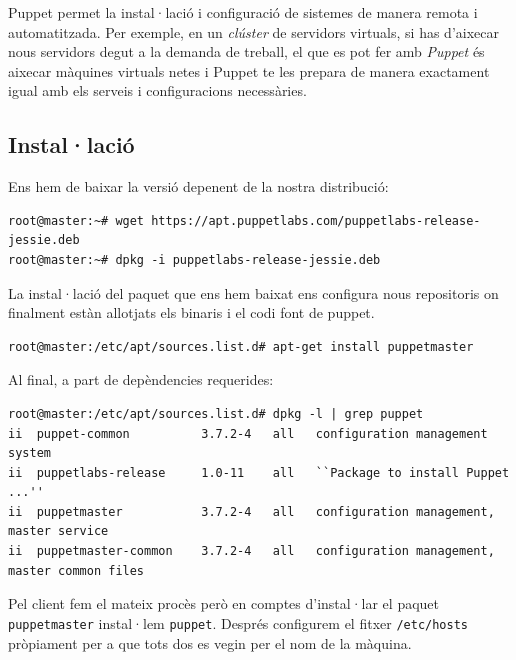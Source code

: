 \documentclass[a4paper]{article}
\begin{document}

Puppet permet la instal·lació i configuració de sistemes de manera remota i automatitzada. Per exemple, en un \textit{clúster} de servidors virtuals, si has d'aixecar nous servidors degut a la demanda de treball, el que es pot fer amb \textit{Puppet} \'{e}s aixecar màquines virtuals netes i Puppet te les prepara de manera exactament igual amb els serveis i configuracions necessàries.

\subsection{Instal·lació}
Ens hem de baixar la versió depenent de la nostra distribució:
\begin{verbatim}
root@master:~# wget https://apt.puppetlabs.com/puppetlabs-release-jessie.deb
root@master:~# dpkg -i puppetlabs-release-jessie.deb
\end{verbatim}
La instal·lació del paquet que ens hem baixat ens configura nous repositoris on finalment estàn allotjats els binaris i el codi font de puppet.
\begin{verbatim}
root@master:/etc/apt/sources.list.d# apt-get install puppetmaster
\end{verbatim}
Al final, a part de depèndencies requerides:
\begin{verbatim}
root@master:/etc/apt/sources.list.d# dpkg -l | grep puppet
ii  puppet-common          3.7.2-4   all   configuration management system
ii  puppetlabs-release     1.0-11    all   ``Package to install Puppet ...''
ii  puppetmaster           3.7.2-4   all   configuration management, master service
ii  puppetmaster-common    3.7.2-4   all   configuration management, master common files
\end{verbatim}
Pel client fem el mateix procès però en comptes d'instal·lar el paquet \verb+puppetmaster+ instal·lem \verb+puppet+. Despr\'es configurem el fitxer \verb+/etc/hosts+ pròpiament per a que tots dos es vegin per el nom de la màquina.
\end{document}
